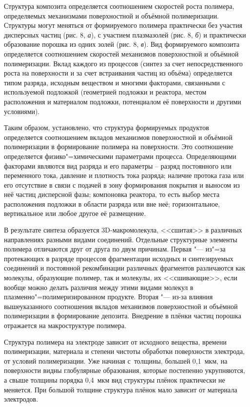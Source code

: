 Структура композита определяется соотношением скоростей роста
полимера, определяемых механизмами поверхностной и объёмной
полимеризации. Структуры могут меняться от формируемого полимера
практически без участия дисперсных частиц (рис. 8, {\sl а\/}), с
участием плазмазолей (рис. 8, {\sl б}\/) и практически образование
порошка из одних золей (рис. 8, {\sl в}\/). Вид формируемого
композита определяется соотношением скоростей механизмов
поверхностной и объёмной полимеризации. Вклад каждого из процессов
(синтез за счет непосредственного роста на поверхности и за счет
встраивания частиц из объёма) определяется типом разряда, исходным
веществом и многими факторами, связанными с используемой подложкой
(геометрией подложки и реактора, местом  расположения и материалом
подложки, потенциалом её поверхности и другими условиями).




Таким образом, установлено, что структура формируемых продуктов
определяется соотношением вкладов механизмов поверхностной и
объёмной полимеризации в формирование полимера на поверхности. Это
соотношение определяется физико"=химическими параметрами процесса.
Определяющими факторами являются вид разряда и его параметры –
разряд постоянного или переменного тока, давление и плотность тока
разряда; наличие протока газа или его отсутствие в связи с подачей
в зону формирования покрытия и выносом из неё частиц дисперсной
фазы; компоновка реактора, то есть выбор места расположения
подложки в области разряда или вне неё; горизонтальное,
вертикальное или любое другое её размещение.

В результате синтеза образуется 3D-макромолекула, <<сшитая>> в
различных направлениях разными видами соединений. Отдельные
структурные элементы полимера отличаются друг от друга по двум
причинам.  Первая "--- из"=за протекающих в разряде процессов
фрагментации исходных и синтезируемых соединений и постоянной
рекомбинации различных фрагментов различаются как молекулы,
образующие полимер, так и молекулы, их <<сшивающие>>, если вообще
можно делать различия между этими видами молекул в
плазменно"=полимеризированном продукте. Вторая "--- из-за влияния
вышеуказанного соотношения вкладов механизмов поверхностной и
объёмной полимеризации в формирование депозита. Внедрение в плёнки
частиц порошка отражается на макроструктуре полимера.

Структура полимера на электроде зависит от исходного вещества,
времени полимеризации, материала и степени чистоты обработки
поверхности электрода, от условий полимеризации. Уже начиная с~толщины,
большей 0,1~мкм, на поверхности видны глобулярные образования,
которые постепенно укрупняются, а свыше толщины порядка 0,4~мкм вид
структуры плёнок практически не меняется. При большой толщине
структура плёнок мало зависит от материала электродов.

